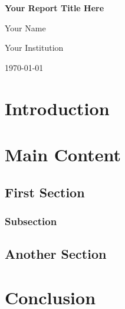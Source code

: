 \documentclass[12pt,a4paper]{report}
\begin{document}
\begin{titlepage}
    \centering
    \vspace*{1cm}
    \huge\textbf{Your Report Title Here}
    
    \vspace{1.5cm}
    \LARGE Your Name
    
    \vspace{1.5cm}
    \large Your Institution
    
    \vfill
    \large\today %
\end{titlepage}

\tableofcontents
\clearpage

\chapter{Introduction}
\lipsum[1-2] %

\chapter{Main Content}
\section{First Section}
\lipsum[3-4]

\subsection{Subsection}
\lipsum[5-6]

\section{Another Section}
\lipsum[7-8]

\chapter{Conclusion}
\lipsum[9-10]

\printbibliography
\end{document}
